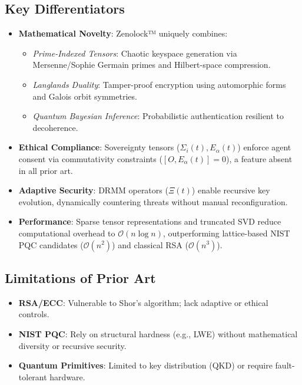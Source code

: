 \documentclass{article}
\theoremstyle{plain}
\begin{document}
\subsection{Key Differentiators}
\begin{itemize}
    \item \textbf{Mathematical Novelty}: Zenolock™ uniquely combines:
    \begin{itemize}
        \item \textit{Prime-Indexed Tensors}: Chaotic keyspace generation via Mersenne/Sophie Germain primes and Hilbert-space compression.
        \item \textit{Langlands Duality}: Tamper-proof encryption using automorphic forms and Galois orbit symmetries.
        \item \textit{Quantum Bayesian Inference}: Probabilistic authentication resilient to decoherence.
    \end{itemize}
    
    \item \textbf{Ethical Compliance}: Sovereignty tensors ($\Sigma_i(t), E_\alpha(t)$) enforce agent consent via commutativity constraints ($[O,E_\alpha(t)]=0$), a feature absent in all prior art.
    
    \item \textbf{Adaptive Security}: DRMM operators ($\Xi(t)$) enable recursive key evolution, dynamically countering threats without manual reconfiguration.
    
    \item \textbf{Performance}: Sparse tensor representations and truncated SVD reduce computational overhead to $\mathcal{O}(n \log n)$, outperforming lattice-based NIST PQC candidates ($\mathcal{O}(n^2)$) and classical RSA ($\mathcal{O}(n^3)$).
\end{itemize}

\subsection{Limitations of Prior Art}
\begin{itemize}
    \item \textbf{RSA/ECC}: Vulnerable to Shor's algorithm; lack adaptive or ethical controls.
    \item \textbf{NIST PQC}: Rely on structural hardness (e.g., LWE) without mathematical diversity or recursive security.
    \item \textbf{Quantum Primitives}: Limited to key distribution (QKD) or require fault-tolerant hardware.
\end{itemize}
\end{document}
